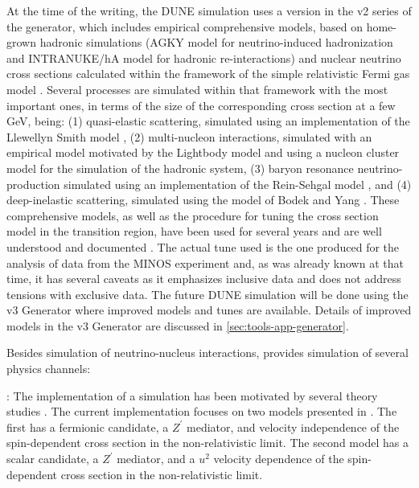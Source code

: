 At the time of the  writing, the DUNE simulation uses a version in the v2 series of the  generator, which includes empirical comprehensive models, based on home-grown hadronic simulations (AGKY model \cite{Yang:2009zx} for neutrino-induced hadronization and INTRANUKE/hA model \cite{Dytman:2015taa} for hadronic re-interactions) and nuclear neutrino cross sections calculated within the framework of the simple relativistic Fermi gas model \cite{Bodek:1981wr}. Several processes are simulated within that framework with the most important ones, in terms of the size of the corresponding cross section at a few GeV, being: (1) quasi-elastic scattering, simulated using an implementation of the Llewellyn Smith model \cite{LlewellynSmith:1971uhs}, (2) multi-nucleon interactions, simulated with an empirical model motivated by the Lightbody model \cite{Lightbody:1988gcu} and using a nucleon cluster model for the simulation of the hadronic system, (3) baryon resonance neutrino-production simulated using an implementation of the Rein-Sehgal model \cite{Rein:1980wg}, and (4) deep-inelastic scattering, simulated using the model of Bodek and Yang \cite{Bodek:2002ps}.  These comprehensive models, as well as the  procedure for tuning the cross section model in the transition region, have been used for several years and are well understood and documented \cite{Andreopoulos:2009rq}. The actual tune used is the one produced for the analysis of data from the MINOS experiment and, as was already known at that time, it has several caveats as it emphasizes inclusive data and does not address tensions with exclusive data. The future DUNE simulation will be done using the v3  Generator where improved models and tunes are available. Details of improved models in the v3  Generator are discussed in \ref{sec:tools-app-generator}. %



Besides simulation of neutrino-nucleus interactions,  provides simulation of several  physics channels:

\textit{}: The implementation of a   simulation has been motivated by several theory studies \cite{Agashe:2014yua, 
Berger:2014sqa, Kong:2014mia, Cherry:2015oca, Kopp:2015bfa, Necib:2016aez, Alhazmi:2016qcs, Kim:2016zjx}. The current implementation focuses on two models presented in  \cite{Berger:2014sqa}. The first has a fermionic  candidate, a $Z^\prime$ mediator, and velocity independence of the spin-dependent cross section in the non-relativistic limit. The second model has a scalar  candidate, a $Z^\prime$ mediator, and a $u^2$ velocity dependence of the spin-dependent cross section in the non-relativistic limit.

